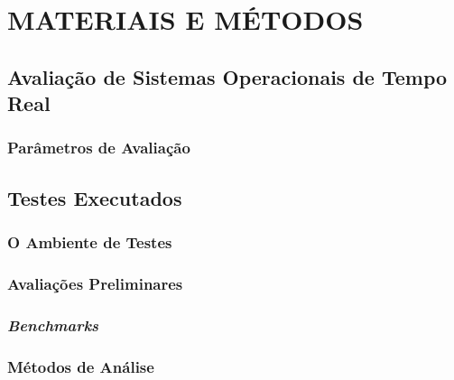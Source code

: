 \chapter{MATERIAIS E MÉTODOS}
\label{cap:projeto}

\section{Avaliação de Sistemas Operacionais de Tempo Real}
\subsection{Parâmetros de Avaliação}

\section{Testes Executados}
\subsection{O Ambiente de Testes}
\subsection{Avaliações Preliminares}
\subsection{\textit{Benchmarks}}
\subsection{Métodos de Análise}
